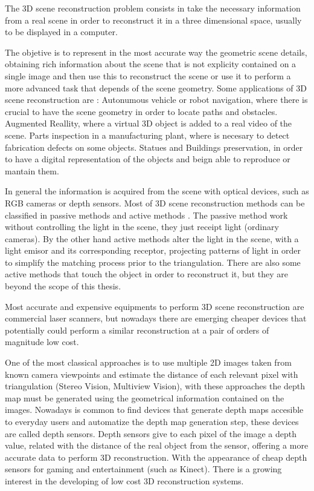
The 3D scene reconstruction problem consists in take the
necessary information from a real scene in order to reconstruct
it in a three dimensional space, usually to be displayed 
in a computer. 

The objetive is to represent in the most accurate way the geometric scene details, obtaining rich 
information about the scene that is not explicity contained on a single image and then use this 
to reconstruct the scene or use it to perform a more advanced task that depends of the scene geometry. 
Some applications of 3D scene reconstruction are : Autonumous vehicle or robot navigation, where there is crucial to have 
the scene geometry in order to locate paths and obstacles. Augmented Reallity, where a virtual 3D object
 is added to a real video of the scene. Parts inspection in a manufacturing plant, where is necesary to detect
 fabrication defects on some objects. Statues and Buildings preservation, in order to have a digital representation 
of the objects and beign able to reproduce or mantain them.

 
In general the information is acquired
 from the scene with optical devices, such as RGB cameras or depth sensors.
Most of 3D scene reconstruction methods can be classified in passive methods and active methods \cite{lanman}.
The passive method work without controlling the light in the scene, they just receipt light (ordinary cameras). 
By the other hand active methods alter the light in the scene, with a light emisor and its corresponding 
receptor, projecting patterns of light in order to simplify the matching process prior to the triangulation. 
There are also some active methods that touch the object in order to reconstruct it, but they are beyond 
the scope of this thesis. 

Most accurate and expensive equipments to perform 3D scene reconstruction are commercial laser scanners,
 but nowadays there are emerging cheaper devices that 
potentially could perform 
a similar reconstruction at a pair of orders of magnitude low cost. 

One of the most classical approaches is to use multiple 2D
 images taken from known camera viewpoints and estimate the distance of each
 relevant pixel with triangulation (Stereo Vision, Multiview Vision), with these 
approaches the depth map must be generated using the geometrical information contained
 on the images. Nowadays is common to find devices that generate depth maps accesible
 to everyday users and automatize the depth map generation step, these devices are called depth sensors. 
Depth sensors give to each pixel of the image a depth value, related
with the distance of the real object from the sensor, offering a more
accurate data to perform 3D reconstruction. With the appearance
of cheap depth sensors for gaming and entertainment (such as
Kinect). There is a growing interest in the developing of low cost
3D reconstruction systems. 


